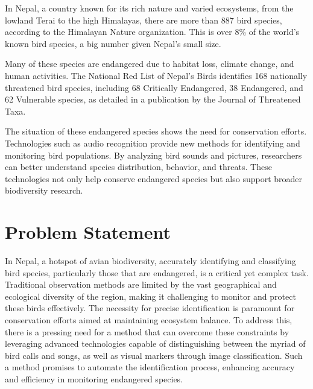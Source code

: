 In Nepal, a country known for its rich nature and varied ecosystems, from the
lowland Terai to the high Himalayas, there are more than 887 bird species,
according to the Himalayan Nature organization. This is over 8\% of the world's
known bird species, a big number given Nepal's small size.\cite{himalayan}

Many of these species are endangered due to habitat loss, climate change, and
human activities. The National Red List of Nepal's Birds identifies 168
nationally threatened bird species, including 68 Critically Endangered, 38
Endangered, and 62 Vulnerable species, as detailed in a publication by the
Journal of Threatened Taxa.\cite{inskipp2017nepala}

The situation of these endangered species shows the need for conservation
efforts. Technologies such as audio recognition provide new methods for
identifying and monitoring bird populations. By analyzing bird sounds and
pictures, researchers can better understand species distribution, behavior, and
threats. These technologies not only help conserve endangered species but also
support broader biodiversity research.

\section{Problem Statement}
In Nepal, a hotspot of avian biodiversity, accurately identifying and
classifying bird species, particularly those that are endangered, is a critical
yet complex task. Traditional observation methods are limited by the vast
geographical and ecological diversity of the region, making it challenging to
monitor and protect these birds effectively. The necessity for precise
identification is paramount for conservation efforts aimed at maintaining
ecosystem balance. To address this, there is a pressing need for a method that
can overcome these constraints by leveraging advanced technologies capable of
distinguishing between the myriad of bird calls and songs, as well as visual
markers through image classification. Such a method promises to automate the
identification process, enhancing accuracy and efficiency in monitoring
endangered species.


